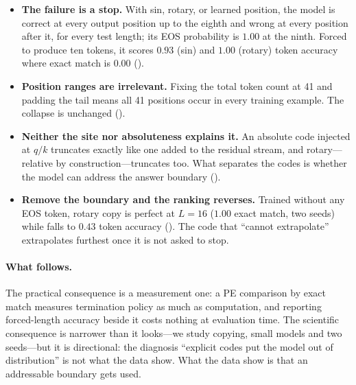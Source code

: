 \begin{itemize}[leftmargin=1.1em,itemsep=1pt,topsep=2pt]
\item \textbf{The failure is a stop.} With sin, rotary, or learned position, the
  model is correct at every output position up to the eighth and wrong at every
  position after it, for every test length; its EOS probability is $1.00$ at the
  ninth. Forced to produce ten tokens, it scores $0.93$ (sin) and $1.00$ (rotary)
  token accuracy where exact match is $0.00$ ().
\item \textbf{Position ranges are irrelevant.} Fixing the total token count at 41
  and padding the tail means all 41 positions occur in every training example. The
  collapse is unchanged ().
\item \textbf{Neither the site nor absoluteness explains it.} An absolute code
  injected at $q/k$ truncates exactly like one added to the residual stream, and
  rotary---relative by construction---truncates too. What separates the codes is
  whether the model can address the answer boundary ().
\item \textbf{Remove the boundary and the ranking reverses.} Trained without any EOS
  token, rotary copy is perfect at $L{=}16$ ($1.00$ exact match, two seeds) while
  \nope{} falls to $0.43$ token accuracy (). The code that
  ``cannot extrapolate'' extrapolates furthest once it is not asked to stop.
\end{itemize}

\paragraph{What follows.} The practical consequence is a measurement one: a PE
comparison by exact match measures termination policy as much as computation, and
reporting forced-length accuracy beside it costs nothing at evaluation time. The
scientific consequence is narrower than it looks---we study copying, small models
and two seeds---but it is directional: the diagnosis ``explicit codes put the model
out of distribution'' is not what the data show. What the data show is that an
addressable boundary gets used.
